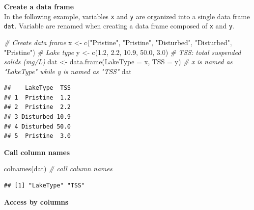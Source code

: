 \documentclass[
]{book}
\newenvironment{Shaded}{\begin{snugshade}}{\end{snugshade}}
\newcommand{\AttributeTok}[1]{\textcolor[rgb]{0.77,0.63,0.00}{#1}}
\newcommand{\CommentTok}[1]{\textcolor[rgb]{0.56,0.35,0.01}{\textit{#1}}}
\newcommand{\FloatTok}[1]{\textcolor[rgb]{0.00,0.00,0.81}{#1}}
\newcommand{\FunctionTok}[1]{\textcolor[rgb]{0.00,0.00,0.00}{#1}}
\newcommand{\NormalTok}[1]{#1}
\newcommand{\OtherTok}[1]{\textcolor[rgb]{0.56,0.35,0.01}{#1}}
\newcommand{\SpecialCharTok}[1]{\textcolor[rgb]{0.00,0.00,0.00}{#1}}
\newcommand{\StringTok}[1]{\textcolor[rgb]{0.31,0.60,0.02}{#1}}
\begin{document}
\textbf{Create a data frame}\\
In the following example, variables \texttt{x} and \texttt{y} are organized into a single data frame \texttt{dat}. Variable are renamed when creating a data frame composed of \texttt{x} and \texttt{y}.

\begin{Shaded}
\begin{Highlighting}[]
\CommentTok{\# Create data frame}
\NormalTok{x }\OtherTok{\textless{}{-}} \FunctionTok{c}\NormalTok{(}\StringTok{"Pristine"}\NormalTok{, }\StringTok{"Pristine"}\NormalTok{, }\StringTok{"Disturbed"}\NormalTok{, }\StringTok{"Disturbed"}\NormalTok{, }\StringTok{"Pristine"}\NormalTok{) }\CommentTok{\# Lake type}
\NormalTok{y }\OtherTok{\textless{}{-}} \FunctionTok{c}\NormalTok{(}\FloatTok{1.2}\NormalTok{, }\FloatTok{2.2}\NormalTok{, }\FloatTok{10.9}\NormalTok{, }\FloatTok{50.0}\NormalTok{, }\FloatTok{3.0}\NormalTok{) }\CommentTok{\# TSS: total suspended solids (mg/L)}
\NormalTok{dat }\OtherTok{\textless{}{-}} \FunctionTok{data.frame}\NormalTok{(}\AttributeTok{LakeType =}\NormalTok{ x, }\AttributeTok{TSS =}\NormalTok{ y) }\CommentTok{\# x is named as "LakeType" while y is named as "TSS"}
\NormalTok{dat}
\end{Highlighting}
\end{Shaded}

\begin{verbatim}
##    LakeType  TSS
## 1  Pristine  1.2
## 2  Pristine  2.2
## 3 Disturbed 10.9
## 4 Disturbed 50.0
## 5  Pristine  3.0
\end{verbatim}

\textbf{Call column names}

\begin{Shaded}
\begin{Highlighting}[]
\FunctionTok{colnames}\NormalTok{(dat) }\CommentTok{\# call column names}
\end{Highlighting}
\end{Shaded}

\begin{verbatim}
## [1] "LakeType" "TSS"
\end{verbatim}

\textbf{Access by columns}

\begin{Shaded}
\end{Shaded}
\end{document}

